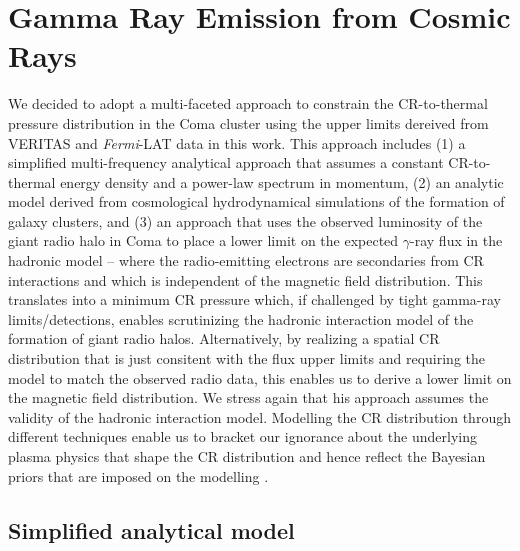 \documentclass[12pt,manuscript]{aastex}
\begin{document}
\section{Gamma Ray Emission from Cosmic Rays}
We decided to adopt a multi-faceted approach to constrain the CR-to-thermal pressure distribution
in the Coma cluster using the upper limits dereived from VERITAS and \emph{Fermi}-LAT data in this
work. This approach includes (1) a simplified multi-frequency analytical approach that assumes a
constant CR-to-thermal energy density and a power-law spectrum in momentum, (2) an analytic model
derived from cosmological hydrodynamical simulations of the formation of galaxy clusters, and (3)
an approach that uses the
observed luminosity of the giant radio halo in Coma to place a lower limit on the expected
$\gamma$-ray flux in the hadronic model -- where the radio-emitting electrons are secondaries from
CR interactions and which is independent of the magnetic field distribution.  This translates into a
minimum CR pressure which, if challenged by tight gamma-ray limits/detections, enables scrutinizing
the hadronic interaction model of the formation of giant radio halos. Alternatively, by realizing a
spatial CR distribution that is just consitent with the flux upper limits and requiring the model to
match the observed radio data, this enables us to derive a lower limit on the magnetic field
distribution. We stress again that his approach assumes the validity of the hadronic interaction
model. Modelling the CR distribution through different techniques enable
us to bracket our ignorance about the underlying plasma physics that shape the CR distribution and
hence reflect the Bayesian priors that are imposed on the modelling \citep[see][for a
discussion]{article:PinzkePfrommerBergstrom}.

%
%

\subsection{Simplified analytical model}
\label{sec:simple}
\end{document}

